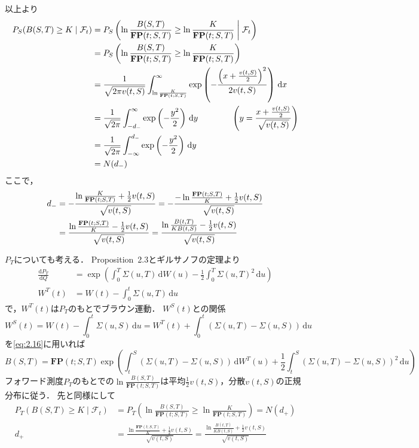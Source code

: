 \documentclass[a4paper, lualatex, ja=standard]{bxjsarticle}
\theoremstyle{theorem}
\theoremstyle{definition}
\newcommand{\F}{\mathcal{F}}
\newcommand{\FP}{\mathbf{FP}}
\newcommand{\diff}{\mathrm{d}}
\newcommand{\relmiddle}[1]{\mathrel{}\middle#1\mathrel{}}
\begin{document}
以上より
\begin{align}
  P_S(B(S,T)\geq K\mid\F_t) &= P_S\left(\ln\frac{B(S,T)}{\FP(t;S,T)}\geq\ln\frac{K}{\FP(t;S,T)}\relmiddle|\F_t\right) \notag\\
  &= P_S\left(\ln\frac{B(S,T)}{\FP(t;S,T)}\geq\ln\frac{K}{\FP(t;S,T)}\right) \notag\\
  &= \frac{1}{\sqrt{2\pi v(t,S)}}\int_{\ln\frac{K}{\FP(t;S,T)}}^\infty\exp\left(-\frac{\left(x+\frac{v(t,S)}{2}\right)^2}{2v(t,S)}\right)\,\diff x \notag\\
  &= \frac{1}{\sqrt{2\pi}}\int_{-d_{-}}^\infty \exp\left(-\frac{y^2}{2}\right)\,\diff y \qquad\qquad \left(y=\frac{x+\frac{v(t,S)}{2}}{\sqrt{v(t,S)}}\right) \notag\\
  &= \frac{1}{\sqrt{2\pi}}\int_{-\infty}^{d_{-}} \exp\left(-\frac{y^2}{2}\right)\,\diff y \notag\\
  &= N(d_{-}) 
\end{align}
ここで，
\begin{align}
  d_{-} &= -\frac{\ln\frac{K}{\FP(t;S,T)} + \frac{1}{2}v(t,S)}{\sqrt{v(t,S)}} 
  = -\frac{-\ln\frac{\FP(t;S,T)}{K} + \frac{1}{2}v(t,S)}{\sqrt{v(t,S)}} \notag\\
  &= \frac{\ln\frac{\FP(t;S,T)}{K} - \frac{1}{2}v(t,S)}{\sqrt{v(t,S)}} 
  = \frac{\ln\frac{B(t,T)}{KB(t,S)}-\frac{1}{2}v(t,S)}{\sqrt{v(t,S)}}\label{eq:2.18}
\end{align}

$P_T$についても考える．
Proposition~2.3とギルサノフの定理より
\begin{align*}
  \frac{\diff P_T}{\diff Q} &= \exp\left(\int_0^T\Sigma(u,T)\,\diff W(u) - \frac{1}{2}\int_0^T\Sigma(u,T)^2\,\diff u\right) \\
  W^T(t) &= W(t) - \int_0^t\Sigma(u,T)\,\diff u
\end{align*}
で，$W^T(t)$は$P_T$のもとでブラウン運動．
$W^S(t)$との関係
\begin{equation*}
  W^S(t) = W(t) - \int_0^t\Sigma(u,S)\,\diff u = W^T(t) + \int_0^t(\Sigma(u,T)-\Sigma(u,S))\,\diff u
\end{equation*}
を\eqref{eq:2.16}に用いれば
\begin{equation*}
  B(S,T) = \FP(t;S,T)\exp\left(\int_t^S(\Sigma(u,T)-\Sigma(u,S))\,\diff W^T(u) + \frac{1}{2}\int_t^S(\Sigma(u,T)-\Sigma(u,S))^2\,\diff u\right)
\end{equation*}
フォワード測度$P_T$のもとでの$\ln\frac{B(S,T)}{\FP(t;S,T)}$は平均$\frac{1}{2}v(t,S)$，分散$v(t,S)$の正規分布に従う．
先と同様にして
\begin{align}
  P_T(B(S,T)\geq K\mid\F_t) &= P_T\left(\ln\frac{B(S,T)}{\FP(t;S,T)}\geq\ln\frac{K}{\FP(t;S,T)}\right) = N(d_{+})\label{eq:2.19}\\
  d_{+} &= \frac{\ln\frac{\FP(t;S,T)}{K}+\frac{1}{2}v(t,S)}{\sqrt{v(t,S)}} = \frac{\ln\frac{B(t,T)}{KB(t,S)}+\frac{1}{2}v(t,S)}{\sqrt{v(t,S)}}\label{eq:2.20}
\end{align}
\end{document}

